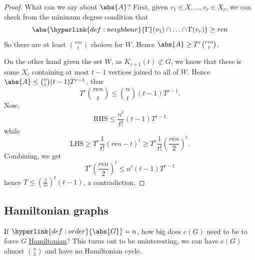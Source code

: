 \documentclass{article}
\begin{document}
\begin{proof}
    What can we say about $\abs{A}$?
    First, given $v_1 \in X, \dotsc, v_r \in X_r$, we can check from the minimum degree condition that
    \begin{equation*}
        \abs{\hyperlink{def:neighbour}{\Gamma}(v_1) \cap \dotsc \cap \Gamma(v_r)} \geq r \epsilon n
    \end{equation*}
    So there are at least $\binom{r \epsilon n}{t}$ choices for $W$. Hence $\abs{A} \geq T^r \binom{r \epsilon n}{t}$.

    On the other hand given the set $W$, as $K_{r+1}(t) \not\subset G$, we know that there is some $X_i$ containing at most $t-1$ vertices joined to all of $W$.
    Hence $\abs{A} \leq \binom{n}{t} (t-1) T^{r-1}$, thus
    \begin{equation*}
        T^r \binom{r \epsilon n}{t} \leq \binom{n}{t} (t-1) T^{r-1}.
    \end{equation*}
    Now,
    \begin{equation*}
        \text{RHS} \leq \frac{n^t}{t!} (t-1) T^{r-1}
    \end{equation*}
    while
    \begin{equation*}
        \text{LHS} \geq T^r \frac{1}{t!} (r \epsilon n - t)^t \geq T^r \frac{1}{t!} \left(\frac{r \epsilon n}{2}\right)^t.
    \end{equation*}
    Combining, we get
    \begin{equation*}
        T^r \left(\frac{r \epsilon n}{2}\right)^t \leq n^t (t-1) T^{r-1}
    \end{equation*}
    hence $T \leq (\frac{2}{r \epsilon})^t (t-1)$, a contradiction.
\end{proof}

\subsection{Hamiltonian graphs}
If $\hyperlink{def:order}{\abs{G}} = n$, how big does $e(G)$ need to be to force $G$ \hyperlink{def:hamil}{Hamiltonian}?
This turns out to be uninteresting, we can have $e(G)$ almost $\binom{n}{2}$ and have no Hamiltonian cycle.
\begin{center}
\end{center}
\end{document}
